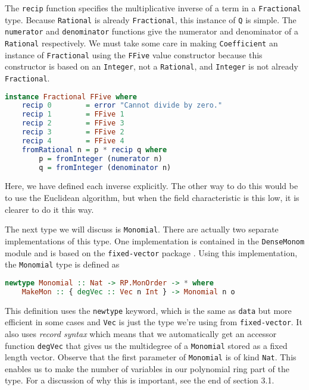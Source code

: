 \documentclass[MS, xcolor=dvipsnames]{wfuthesis}
\theoremstyle{definition}
\begin{document}
The \lstinline{recip} function specifies the multiplicative inverse of a term in a \lstinline{Fractional} type. Because \lstinline{Rational} is already \lstinline{Fractional}, this instance of \lstinline{Q} is simple. The \lstinline{numerator} and \lstinline{denominator} functions give the numerator and denominator of a \lstinline{Rational} respectively. We must take some care in making \lstinline{Coefficient} an instance of \lstinline{Fractional} using the \lstinline{FFive} value constructor because this constructor is based on an \lstinline{Integer}, not a \lstinline{Rational}, and \lstinline{Integer} is not already \lstinline{Fractional}. 
\begin{lstlisting}[language=Haskell]
instance Fractional FFive where
    recip 0        = error "Cannot divide by zero."
    recip 1        = FFive 1
    recip 2        = FFive 3
    recip 3        = FFive 2
    recip 4        = FFive 4
    fromRational n = p * recip q where
        p = fromInteger (numerator n)
        q = fromInteger (denominator n)
\end{lstlisting}
Here, we have defined each inverse explicitly. The other way to do this would be to use the Euclidean algorithm, but when the field characteristic is this low, it is clearer to do it this way. \par 
The next type we will discuss is \lstinline{Monomial}. There are actually two separate implementations of this type. One implementation is contained in the \lstinline{DenseMonom} module and is based on the \lstinline{fixed-vector} package \cite{Shimuuar}. Using this implementation, the \lstinline{Monomial} type is defined as 
\begin{lstlisting}[language=Haskell]
newtype Monomial :: Nat -> RP.MonOrder -> * where
    MakeMon :: { degVec :: Vec n Int } -> Monomial n o
\end{lstlisting}
This definition uses the \lstinline{newtype} keyword, which is the same as \lstinline{data} but more efficient in some cases and \lstinline{Vec} is just the type we're using from \lstinline{fixed-vector}. It also uses \emph{record syntax} which means that we automatically get an accessor function \lstinline{degVec} that gives us the multidegree of a \lstinline{Monomial} stored as a fixed length vector. Observe that the first parameter of \lstinline{Monomial} is of kind \lstinline{Nat}. This enables us to make the number of variables in our polynomial ring part of the type. For a discussion of why this is important, see the end of section 3.1. \par 
\end{document}
